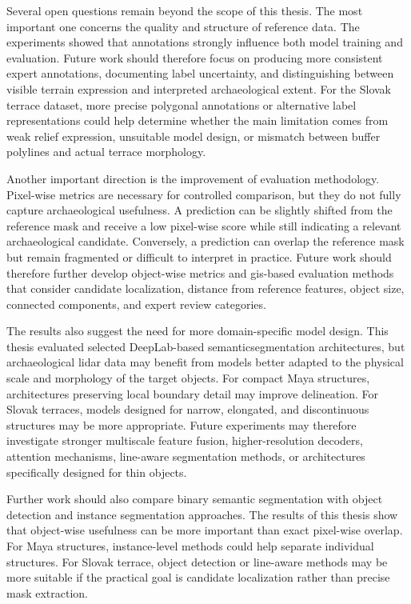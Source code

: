 Several open questions remain beyond the scope of this thesis. The most important one concerns the quality and structure of reference data. The experiments showed that annotations strongly influence both model training and evaluation. Future work should therefore focus on producing more consistent expert annotations, documenting label uncertainty, and distinguishing between visible terrain expression and interpreted archaeological extent. For the Slovak terrace dataset, more precise polygonal annotations or alternative label representations could help determine whether the main limitation comes from weak relief expression, unsuitable model design, or mismatch between \gls{buffer} polylines and actual terrace morphology.

Another important direction is the improvement of evaluation methodology. Pixel-wise metrics are necessary for controlled comparison, but they do not fully capture archaeological usefulness. A prediction can be slightly shifted from the reference mask and receive a low pixel-wise score while still indicating a relevant archaeological candidate. Conversely, a prediction can overlap the reference mask but remain fragmented or difficult to interpret in practice. Future work should therefore further develop object-wise metrics and \gls{gis}-based evaluation methods that consider candidate localization, distance from reference features, object size, connected components, and expert review categories.

The results also suggest the need for more domain-specific model design. This thesis evaluated selected DeepLab-based \gls{semanticsegmentation} architectures, but archaeological \gls{lidar} data may benefit from models better adapted to the physical scale and morphology of the target objects. For compact Maya structures, architectures preserving local boundary detail may improve delineation. For Slovak terraces, models designed for narrow, elongated, and discontinuous structures may be more appropriate. Future experiments may therefore investigate stronger multiscale feature fusion, higher-resolution decoders, attention mechanisms, line-aware segmentation methods, or architectures specifically designed for thin objects.

Further work should also compare binary semantic segmentation with object detection and instance segmentation approaches. The results of this thesis show that object-wise usefulness can be more important than exact pixel-wise overlap. For Maya structures, instance-level methods could help separate individual structures. For Slovak terrace, object detection or line-aware methods may be more suitable if the practical goal is candidate localization rather than precise mask extraction.

